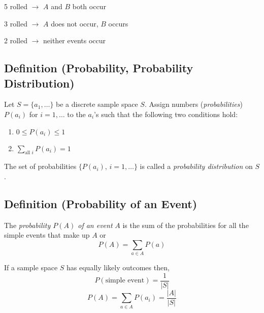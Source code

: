 5 rolled $ \rightarrow $ $ A $ and $ B $ both occur

3 rolled $ \rightarrow $ $ A $ does not occur, $ B $ occurs

2 rolled $ \rightarrow $ neither events occur

\begin{defbox}
    \subsection{Definition (Probability, Probability Distribution)}
    Let $ S=\{a_1,\ldots\} $ be a discrete sample space $ S $. Assign
    numbers (\emph{probabilities}) $ P(a_i) $ for $ i=1,\ldots $ to the $ a_i $'s
    such that the following two conditions hold:
    \begin{enumerate}[label=(\arabic*)]
        \item $ 0\le P(a_i)\le 1 $
        \item $\sum\limits_{\text{all } i}P(a_i)=1 $
    \end{enumerate}
    The set of probabilities $ \{P(a_i),\,i=1,\ldots \} $ is called
    a \emph{probability distribution} on $ S $.
\end{defbox}

\begin{defbox}
    \subsection{Definition (Probability of an Event)}
    The \emph{probability $ P(A) $ of an event} $ A $ is the sum of the
    probabilities for all the simple events that make up $ A $ or
    \[ P(A)=\sum\limits_{a\in A}P(a) \]
\end{defbox}

If a sample space $ S $ has equally likely outcomes then,
\[ P(\text{simple event})=\frac{1}{|S|} \]
\[ P(A)=\sum\limits_{a\in A} P(a_i)=\frac{|A|}{|S|} \]
